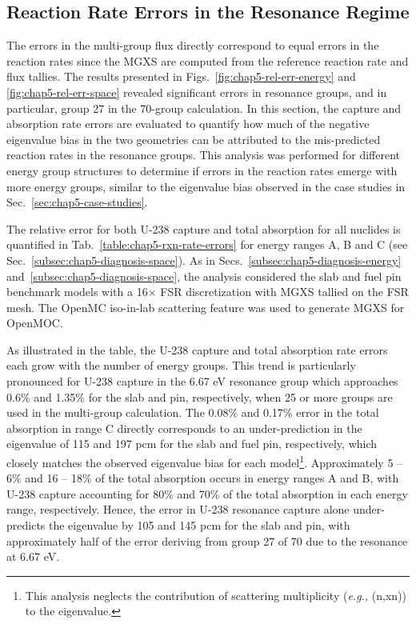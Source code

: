 \subsection{Reaction Rate Errors in the Resonance Regime}
\label{subsec:chap5-diagnosis-rxn-rates}

The errors in the multi-group flux directly correspond to equal errors in the reaction rates since the \ac{MGXS} are computed from the reference reaction rate and flux tallies. The results presented in Figs.~\ref{fig:chap5-rel-err-energy} and \ref{fig:chap5-rel-err-space} revealed significant errors in resonance groups, and in particular, group 27 in the 70-group calculation. In this section, the capture and absorption rate errors are evaluated to quantify how much of the negative eigenvalue bias in the two geometries can be attributed to the mis-predicted reaction rates in the resonance groups. This analysis was performed for different energy group structures to determine if errors in the reaction rates emerge with more energy groups, similar to the eigenvalue bias observed in the case studies in Sec.~\ref{sec:chap5-case-studies}.

The relative error for both U-238 capture and total absorption for all nuclides is quantified in Tab.~\ref{table:chap5-rxn-rate-errors} for energy ranges A, B and C (see Sec.~\ref{subsec:chap5-diagnosis-space}). As in Secs.~\ref{subsec:chap5-diagnosis-energy} and~\ref{subsec:chap5-diagnosis-space}, the analysis considered the slab and fuel pin benchmark models with a 16$\times$ \ac{FSR} discretization with \ac{MGXS} tallied on the \ac{FSR} mesh. The OpenMC iso-in-lab scattering feature was used to generate \ac{MGXS} for OpenMOC.

As illustrated in the table, the U-238 capture and total absorption rate errors each grow with the number of energy groups. This trend is particularly pronounced for U-238 capture in the 6.67 eV resonance group which approaches 0.6\% and 1.35\% for the slab and pin, respectively, when 25 or more groups are used in the multi-group calculation. The 0.08\% and 0.17\% error in the total absorption in range C directly corresponds to an under-prediction in the eigenvalue of 115 and 197 \ac{pcm} for the slab and fuel pin, respectively, which closely matches the observed eigenvalue bias for each model\footnote{This analysis neglects the contribution of scattering multiplicity (\textit{e.g.,} (n,xn)) to the eigenvalue.}. Approximately 5 -- 6\% and 16 -- 18\% of the total absorption occurs in energy ranges A and B, with U-238 capture accounting for 80\% and 70\% of the total absorption in each energy range, respectively. Hence, the error in U-238 resonance capture alone under-predicts the eigenvalue by 105 and 145 \ac{pcm} for the slab and pin, with approximately half of the error deriving from group 27 of 70 due to the resonance at 6.67 eV. 

